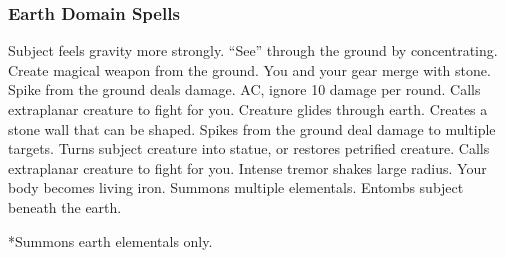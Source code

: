 \begin{comment}
\subsubsection{Dragon Domain Spells}

\begin{spelllist}
  \spellheadc[1]{Burning Hands}\fn{1} 1d6 fire damage.
  \spellhead[1]{Command} One subject obeys selected command for 1 round.
  \spellhead[2]{}
  \spellhead[2]{Locate Object} Senses direction toward object (specific or type).
  \spellheadc[3]{Lightning Bolt}\fn{1} Large line of electricity deals 3d8 damage.
  \spellhead[4]{Fly} Subject flies at speed of 60 ft.
  \spellhead[4]{Suggestion} Compels subject to follow stated course of action.
  \spellheadc[5]{Command}{Mass} As \spell{command}, but affects multiple creatures.
  \spellheadc[5]{Cone of Cold}\fn{1} 5d8 cold damage and brief slow in large cone.
  \spellhead[6]{Locate Entity} Locates creatures or objects within 1 mile.
  \spellhead[6]{True Seeing}\M Lets you see all things as they really are.
  \spellhead[7]{Overland Flight} You fly at a speed of 40 ft. and can hustle over long distances.
  \spellhead[7]{Power Word Blind} Blinds bloodied creature.
  \spellhead[8]{Power Word Stun} Stuns bloodied creature.
  \spellheadc[8]{Suggestion}{Mass} As \spell{suggestion}, but shorter and affects multiple creatures.
  \spellhead[9]{Power Word Kill} Kills bloodied creature.
  \spellhead[9]{}
\end{spelllist}
1 Used as a breath attack, requiring no somatic components.
\end{comment}

\subsubsection{Earth Domain Spells}

\begin{spelllist}
   Subject feels gravity more strongly.
   ``See'' through the ground by concentrating.
   Create magical weapon from the ground.
  \spellhead[2]{}
   You and your gear merge with stone.
   Spike from the ground deals damage. 
    AC, ignore 10 damage per round.
   Calls extraplanar creature to fight for you.
   Creature glides through earth. 
   Creates a stone wall that can be shaped.
   Spikes from the ground deal damage to multiple targets.
   Turns subject creature into statue, or restores petrified creature.
  \spellhead[7]{}
   Calls extraplanar creature to fight for you.
   Intense tremor shakes large radius.
   Your body becomes living iron.
   Summons multiple elementals.
   Entombs subject beneath the earth.
\end{spelllist}
*Summons earth elementals only.

